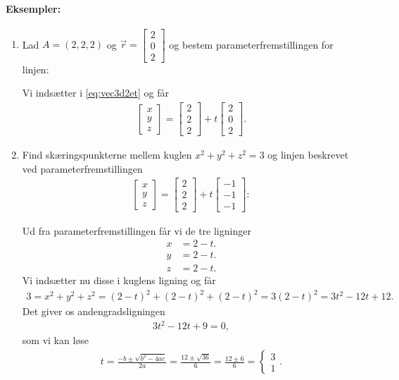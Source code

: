 \paragraph*{Eksempler:}
\begin{enumerate}
\item Lad $A=(2,2,2)$ og $\vec{r}= \begin{bmatrix}2 \\ 0 \\ 2\end{bmatrix}$ og bestem parameterfremstillingen for linjen:

Vi indsætter i \eqref{eq:vec3d2et} og får
\begin{align*}
\begin{bmatrix}x \\ y \\ z\end{bmatrix} = \begin{bmatrix}2 \\2 \\ 2\end{bmatrix}  +t
\begin{bmatrix}2 \\0 \\ 2 \end{bmatrix}.
\end{align*}
\item Find skæringspunkterne mellem kuglen $x^2+y^2+z^2=3$ og linjen beskrevet ved parameterfremstillingen
\begin{align*}
\begin{bmatrix}x \\ y \\ z \end{bmatrix} = \begin{bmatrix}2 \\2 \\ 2\end{bmatrix}  +t
\begin{bmatrix}-1 \\-1 \\ -1 \end{bmatrix}:
\end{align*}

Ud fra parameterfremstillingen får vi de tre ligninger
\begin{align*}
x &= 2 - t. \\
y &= 2 - t. \\
z &= 2 - t.
\end{align*}
Vi indsætter nu disse i kuglens ligning og får
\begin{align*}
3 = x^2+y^2+z^2 = (2-t)^2+(2-t)^2+(2-t)^2 = 3(2-t)^2=3t^2-12t+12.
\end{align*}
Det giver os andengradsligningen
\begin{align*}
3t^2-12t+9 = 0,
\end{align*}
som vi kan løse 
\begin{align*}
t = \frac{-b \pm \sqrt{b^2-4ac}}{2a}  = \frac{12 \pm \sqrt{36}}{6} = \frac{12 \pm 6}{6} = \begin{cases} 3 \\ 1 \end{cases}.
\end{align*}
\end{enumerate}
